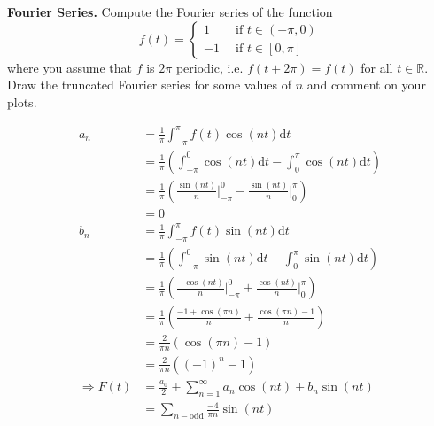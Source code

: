 \textbf{Fourier Series.} Compute the Fourier series of the
function
\[
f(t) = \left\{
\begin{aligned}
 1 &\,\,\, \text{if}\,\, t \in (-\pi, 0) \\
-1 &\,\,\, \text{if}\,\, t \in [0, \pi]
\end{aligned}
\right.
\]
where you assume that $f$ is $2\pi$ periodic, i.e. $f(t+2\pi) = f(t)$
for all $t \in \mathbb{R}$. Draw the truncated Fourier series for some
values of $n$ and comment on your plots.


{\color{blue}

\[
\begin{aligned}
a_n &= \frac{1}{\pi} \int_{-\pi}^{\pi} f(t) \cos(n t) \textrm{d}t \\
&= \frac{1}{\pi} \left(\int_{-\pi}^0 \cos(nt) \textrm{d}t -
\int_0^{\pi} \cos(nt) \textrm{d}t \right) \\
&= \frac{1}{\pi} \left( \frac{\sin(nt)}{n} \bigg|_{-\pi}^0 -
\frac{\sin(nt)}{n} \bigg|_0^{\pi} \right) \\
&= 0 \\
b_n &= \frac{1}{\pi} \int_{-\pi}^{\pi} f(t) \sin(n t) \textrm{d}t \\
&= \frac{1}{\pi} \left(\int_{-\pi}^0 \sin(nt) \textrm{d}t -
\int_0^{\pi} \sin(nt) \textrm{d}t \right) \\
&= \frac{1}{\pi} \left( \frac{-\cos(nt)}{n} \bigg|_{-\pi}^0 +
\frac{\cos(nt)}{n} \bigg|_0^{\pi} \right) \\
&= \frac{1}{\pi} \left(
\frac{-1 + \cos(\pi n)}{n}
+ \frac{\cos(\pi n) - 1}{n}
 \right) \\
&= \frac{2}{\pi n} \left(
 \cos(\pi n) - 1
 \right) \\
&= \frac{2}{\pi n} \left(
 (-1)^n - 1
 \right) \\
\Rightarrow F(t) &= \frac{a_0}{2} + \sum_{n=1}^\infty a_n \cos(n t) +
b_n \sin(n t) \\
&= \sum_{n-\textrm{odd}} \frac{-4}{\pi n} \sin(n t)
\end{aligned}
\]
}
